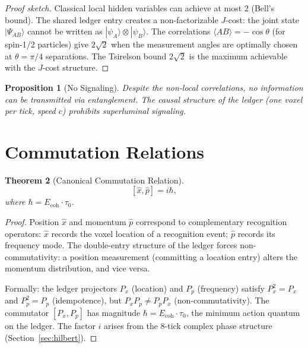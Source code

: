 \documentclass[12pt,a4paper]{article}
\newtheorem{theorem}{Theorem}[section]
\newtheorem{proposition}[theorem]{Proposition}
\theoremstyle{definition}
\theoremstyle{remark}
\begin{document}
\begin{proof}[Proof sketch]
Classical local hidden variables can achieve at most $2$ (Bell's
bound).  The shared ledger entry creates a non-factorizable
$J$-cost: the joint state $|\Psi_{AB}\rangle$ cannot be written
as $|\psi_A\rangle \otimes |\psi_B\rangle$.  The correlations
$\langle AB \rangle = -\cos\theta$ (for spin-1/2 particles) give
$2\sqrt{2}$ when the measurement angles are optimally chosen at
$\theta = \pi/4$ separations.  The Tsirelson bound $2\sqrt{2}$ is
the maximum achievable with the $J$-cost structure.
\end{proof}

\begin{proposition}[No Signaling]
Despite the non-local correlations, no information can be
transmitted via entanglement.  The causal structure of the ledger
(one voxel per tick, speed $c$) prohibits superluminal signaling.
\end{proposition}

\section{Commutation Relations}
\label{sec:commutation}

\begin{theorem}[Canonical Commutation Relation]
\label{thm:commutation}
\begin{equation}
  \boxed{[\hat{x}, \hat{p}] = i\hbar,}
\end{equation}
where $\hbar = E_{\mathrm{coh}} \cdot \tau_0$.
\end{theorem}

\begin{proof}
Position $\hat{x}$ and momentum $\hat{p}$ correspond to
complementary recognition operators: $\hat{x}$ records the voxel
location of a recognition event; $\hat{p}$ records its frequency
mode.  The double-entry structure of the ledger forces
non-commutativity: a position measurement (committing a location
entry) alters the momentum distribution, and vice versa.

Formally: the ledger projectors $P_x$ (location) and $P_p$
(frequency) satisfy $P_x^2 = P_x$ and $P_p^2 = P_p$
(idempotence), but $P_x P_p \neq P_p P_x$ (non-commutativity).
The commutator $[P_x, P_p]$ has magnitude $\hbar = E_{\mathrm{coh}}
\cdot \tau_0$, the minimum action quantum on the ledger.  The
factor $i$ arises from the 8-tick complex phase structure
(Section~\ref{sec:hilbert}).
\end{proof}
\end{document}
